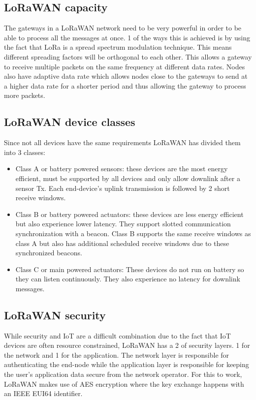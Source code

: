 \subsection{LoRaWAN capacity}

The gateways in a LoRaWAN network need to be very powerful in order to be able to process all the messages at once. 1 of the ways this is achieved is by using the fact that LoRa is a spread spectrum modulation technique. This means different spreading factors will be orthogonal to each other. This allows a gateway to receive multiple packets on the same frequency at different data rates. Nodes also have adaptive data rate which allows nodes close to the gateways to send at a higher data rate for a shorter period and thus allowing the gateway to process more packets.

\subsection{LoRaWAN device classes}

Since not all devices have the same requirements LoRaWAN has divided them into 3 classes:
\begin{itemize}
    \item Class A or battery powered sensors: these devices are the most energy efficient, must be supported by all devices and only allow downlink after a sensor Tx. Each end-device's uplink transmission is followed by 2 short receive windows.
    \item Class B or battery powered actuators: these devices are less energy efficient but also experience lower latency. They support slotted communication synchronization with a beacon. Class B supports the same receive windows as class A  but also has additional scheduled receive windows due to these synchronized beacons.
    \item Class C or main powered actuators: These devices do not run on battery so they can listen continuously. They also experience no latency for downlink messages.
\end{itemize}

\subsection{LoRaWAN security}
While security and IoT are a difficult combination due to the fact that IoT devices are often resource constrained, LoRaWAN has a 2 of security layers. 1 for the network and 1 for the application. The network layer is responsible for authenticating the end-node while the application layer is responsible for keeping the user's application data secure from the network operator. For this to work, LoRaWAN makes use of AES encryption where the key exchange happens with an IEEE EUI64 identifier.

